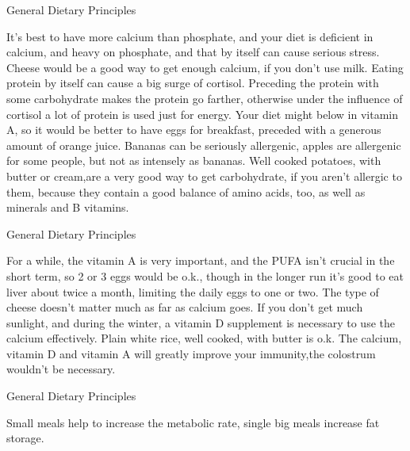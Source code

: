 \documentclass[11pt,oneside,openany,extrafontsizes]{memoir}
\begin{document}
\begin{standalonequote}{General Dietary Principles}

    \begin{answer}
        It's best to have more calcium than phosphate, and your diet is deficient in calcium, and heavy on phosphate, and that by itself can cause serious stress. Cheese would be a good way to get enough calcium, if you don't use milk. Eating protein by itself can cause a big surge of cortisol. Preceding the protein with some carbohydrate makes the protein go farther, otherwise under the influence of cortisol a lot of protein is used just for energy. Your diet might below in vitamin A, so it would be better to have eggs for breakfast, preceded with a generous amount of orange juice. Bananas can be seriously allergenic, apples are allergenic for some people, but not as intensely as bananas. Well cooked potatoes, with butter or cream,are a very good way to get carbohydrate, if you aren't allergic to them, because they contain a good balance of amino acids, too, as well as minerals and B vitamins.
    \end{answer}
\end{standalonequote}

\begin{standalonequote}{General Dietary Principles}

    \begin{answer}
        For a while, the vitamin A is very important, and the PUFA isn't crucial in the short term, so 2 or 3 eggs would be o.k., though in the longer run it's good to eat liver about twice a month, limiting the daily eggs to one or two. The type of cheese doesn't matter much as far as calcium goes. If you don't get much sunlight, and during the winter, a vitamin D supplement is necessary to use the calcium effectively. Plain white rice, well cooked, with butter is o.k. The calcium, vitamin D and vitamin A will greatly improve your immunity,the colostrum wouldn't be necessary.
    \end{answer}
\end{standalonequote}

\begin{standalonequote}{General Dietary Principles}

    \begin{answer}
        Small meals help to increase the metabolic rate, single big meals increase fat storage.
    \end{answer}
\end{standalonequote}
\end{document}
